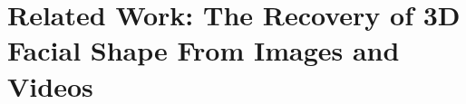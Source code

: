 \chapter{Related Work: The Recovery of 3D Facial Shape From Images and Videos}\label{ch:background}
\lipsum[1-3]
